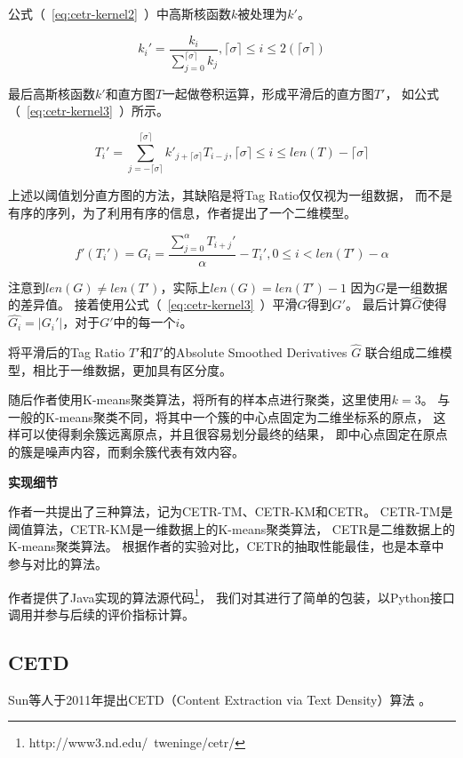 公式（~\ref{eq:cetr-kernel2}~）中高斯核函数$k$被处理为$k'$。

\begin{equation}
\label{eq:cetr-kernel2}
k_i' = \frac{k_i}{\sum_{j=0}^{\lceil \sigma \rceil}k_j},
\lceil \sigma \rceil \leq i \leq 2(\lceil \sigma \rceil)
\end{equation}

最后高斯核函数$k'$和直方图$T$一起做卷积运算，形成平滑后的直方图$T'$，
如公式（~\ref{eq:cetr-kernel3}~）所示。

\begin{equation}
\label{eq:cetr-kernel3}
T_i' = \sum_{j=-\lceil \sigma \rceil}^{\lceil \sigma \rceil}
k'_{j+\lceil \sigma \rceil} T_{i-j},
\lceil \sigma \rceil \leq i \leq len(T)-\lceil \sigma \rceil
\end{equation}

上述以阈值划分直方图的方法，其缺陷是将Tag Ratio仅仅视为一组数据，
而不是有序的序列，为了利用有序的信息，作者提出了一个二维模型。

\begin{equation}
\label{eq:cetr-kernel4}
f'(T_i')=G_i=\frac{\sum_{j=0}^{\alpha} T_{i+j}'}{\alpha} - T_i',
0 \leq i < len(T') - \alpha
\end{equation}

注意到$len(G) \neq len(T')$，实际上$len(G)=len(T')-1$
因为$G$是一组数据的差异值。
接着使用公式（~\ref{eq:cetr-kernel3}~）平滑$G$得到$G'$。
最后计算$\hat{G}$使得$\hat{G_i}=\vert G_i' \vert$，对于$G'$中的每一个$i$。

将平滑后的Tag Ratio $T'$和$T'$的Absolute Smoothed Derivatives $\hat{G}$
联合组成二维模型，相比于一维数据，更加具有区分度。

随后作者使用K-means聚类算法，将所有的样本点进行聚类，这里使用$k=3$。
与一般的K-means聚类不同，将其中一个簇的中心点固定为二维坐标系的原点，
这样可以使得剩余簇远离原点，并且很容易划分最终的结果，
即中心点固定在原点的簇是噪声内容，而剩余簇代表有效内容。

\textbf{实现细节}

作者一共提出了三种算法，记为CETR-TM、CETR-KM和CETR。
CETR-TM是阈值算法，CETR-KM是一维数据上的K-means聚类算法，
CETR是二维数据上的K-means聚类算法。
根据作者的实验对比，CETR的抽取性能最佳，也是本章中参与对比的算法。

作者提供了Java实现的算法源代码\footnote{http://www3.nd.edu/~tweninge/cetr/}，
我们对其进行了简单的包装，以Python接口调用并参与后续的评价指标计算。

\subsection{CETD}
Sun等人于2011年提出CETD（Content Extraction via Text Density）算法
。


